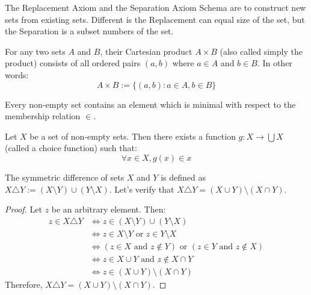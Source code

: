 \documentclass[11pt,lang=en]{elegantbook}
\begin{document}
\begin{remark}
  The Replacement Axiom and the Separation Axiom Schema are to construct new sets from existing sets. Different is the Replacement can equal size of the set, but the Separation is a subset numbers of the set.
\end{remark}

\begin{definition}
  For any two sets $A$ and $B$, their Cartesian product $A \times B$ (also called simply the product) consists of all ordered pairs $(a,b)$ where $a \in A$ and $b \in B$. In other words:
  \[
    A \times B := \{(a,b) : a \in A, b \in B\}
  \]
\end{definition}

\begin{axiom}
  Every non-empty set contains an element which is minimal with respect to the membership relation $\in$. 
\end{axiom}

\begin{axiom}
  Let $X$ be a set of non-empty sets. Then there exists a function $g : X \to \bigcup X$ (called a choice function) such that:
  \[
    \forall x \in X, g(x) \in x
  \]
\end{axiom}

\begin{example}
  The symmetric difference of sets $X$ and $Y$ is defined as $X \triangle Y := (X \setminus Y) \cup (Y \setminus X)$. 
  Let's verify that $X \triangle Y = (X \cup Y) \setminus (X \cap Y)$.
  
  \begin{proof}
    Let $z$ be an arbitrary element. Then:
    \begin{align*}
      z \in X \triangle Y &\iff z \in (X \setminus Y) \cup (Y \setminus X) \\
      &\iff z \in X \setminus Y \text{ or } z \in Y \setminus X \\
      &\iff (z \in X \text{ and } z \notin Y) \text{ or } (z \in Y \text{ and } z \notin X) \\
      &\iff z \in X \cup Y \text{ and } z \notin X \cap Y \\
      &\iff z \in (X \cup Y) \setminus (X \cap Y)
    \end{align*}
    Therefore, $X \triangle Y = (X \cup Y) \setminus (X \cap Y)$.
  \end{proof}
\end{example}
\end{document}
